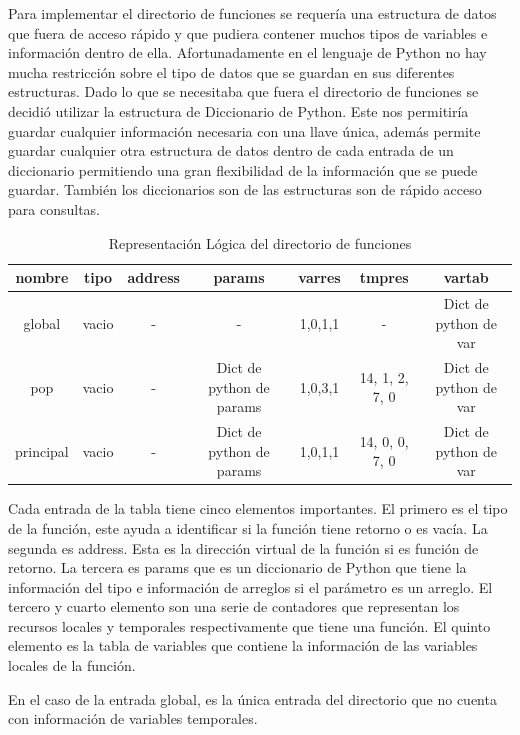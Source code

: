 Para implementar el directorio de funciones se requería una estructura de datos que fuera de acceso rápido y que pudiera contener muchos tipos de variables e información dentro de ella. Afortunadamente en el lenguaje de Python no hay mucha restricción sobre el tipo de datos que se guardan en sus diferentes estructuras. Dado lo que se necesitaba que fuera el directorio de funciones se decidió utilizar la estructura de Diccionario de Python. Este nos permitiría guardar cualquier información necesaria con una llave única, además permite guardar cualquier otra estructura de datos dentro de cada entrada de un diccionario permitiendo una gran flexibilidad de la información que se puede guardar. También los diccionarios son de las estructuras son de rápido acceso para consultas.


\begin{table}[htbp]
    \centering
    \begin{tabular}{|c|c|c|c|c|c|c|}
        nombre & tipo & address & params & varres & tmpres & vartab \\ \hline
        
         global & vacio & - & - & 1,0,1,1 & - & \tiny Dict de python de var  \\
         pop & vacio & -  & \tiny Dict de python de params & 1,0,3,1 & 14, 1, 2, 7, 0 & \tiny Dict de python de var \\
         principal & vacio & - & \tiny Dict de python de params & 1,0,1,1 & 14, 0, 0, 7, 0 & \tiny Dict de python de var  \\
    \end{tabular}
    \caption{Representación Lógica del directorio de funciones}
    \label{tab:my_label}
\end{table}
\FloatBarrier
Cada entrada de la tabla tiene cinco elementos importantes. El primero es el tipo de la función, este ayuda a identificar si la función tiene retorno o es vacía. La segunda es address. Esta es la dirección virtual de la función si es función de retorno. La tercera es params que es un diccionario de Python que tiene la información del tipo e información de arreglos si el parámetro es un arreglo. El tercero y cuarto elemento son una serie de contadores que representan los recursos locales y temporales respectivamente que tiene una función. El quinto elemento es la tabla de variables que contiene la información de las variables locales de la función.

En el caso de la entrada global, es la única entrada del directorio que no cuenta con información de variables temporales.


